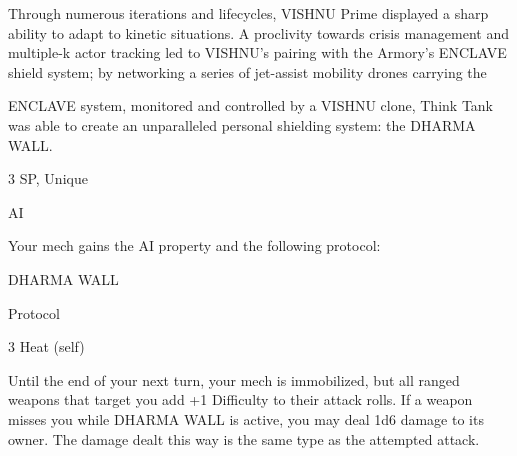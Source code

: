\begin{mech}
Through numerous iterations and lifecycles, VISHNU Prime displayed a sharp ability to adapt to kinetic situations. A proclivity towards crisis management and multiple-k actor tracking led to VISHNU’s pairing with the Armory’s ENCLAVE shield system; by networking a series of jet-assist mobility drones carrying the

ENCLAVE system, monitored and controlled by a VISHNU clone, Think Tank was able to create an unparalleled personal shielding system: the DHARMA WALL.

3 SP, Unique

AI

Your mech gains the AI property and the following protocol:


DHARMA WALL

Protocol

3 Heat (self)

Until the end of your next turn, your mech is immobilized, but all ranged weapons that target you add +1 Difficulty to their attack rolls. If a weapon misses you while DHARMA WALL is active, you may deal 1d6 damage to its owner. The damage dealt this way is the same type as the attempted attack.



\end{mech}